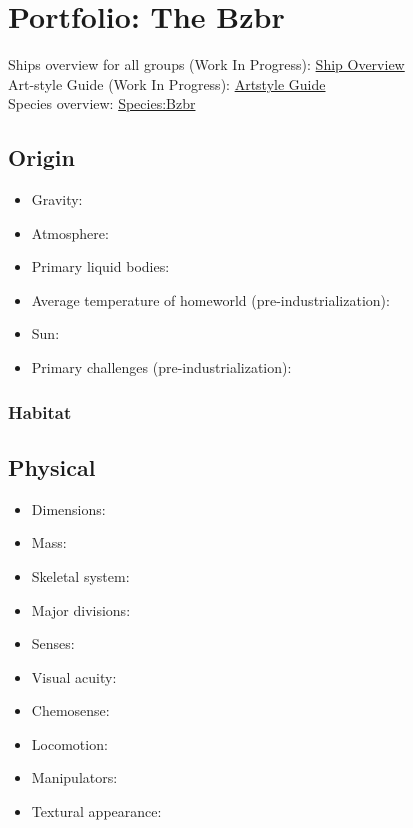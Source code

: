 \section{Portfolio: The Bzbr}
Ships overview for all groups (Work In Progress): \href{http://vegastrike.sourceforge.net/wiki/Artstyle\_guide:Overview\_Guide}{Ship Overview} \\
Art-style Guide (Work In Progress): \href{http://vegastrike.sourceforge.net/wiki/Artstyle\_guide:Bzbr}{Artstyle Guide} \\
Species overview: \href{http://vegastrike.sourceforge.net/wiki/Species:Humanity}{Species:Bzbr} \\

\subsection{Origin}
\begin{itemize}
\item Gravity: 

\item Atmosphere: 

\item Primary liquid bodies: 

\item Average temperature of homeworld (pre-industrialization):

\item Sun: 

\item Primary challenges (pre-industrialization): 
\end{itemize}


\subsubsection{Habitat}

\subsection{Physical}
\begin{itemize}
\item Dimensions: 

\item Mass: 

\item Skeletal system: 

\item Major divisions: 

\item Senses: 

\item Visual acuity: 

\item Chemosense: 

\item Locomotion: 

\item Manipulators: 

\item Textural appearance: 
\end{itemize}

